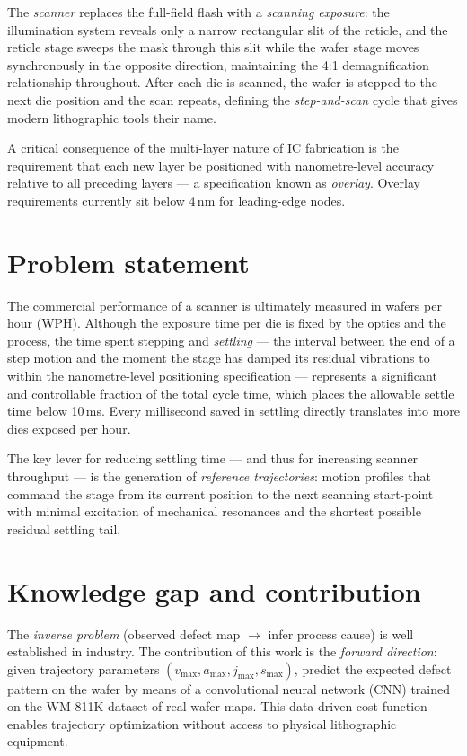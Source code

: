 \documentclass[11pt,letterpaper]{article}
\begin{document}
The \textit{scanner} replaces the full-field flash with a \textit{scanning exposure}: the illumination system reveals only a narrow rectangular slit of the reticle, and the reticle stage sweeps the mask through this slit while the wafer stage moves synchronously in the opposite direction, maintaining the 4:1 demagnification relationship throughout. After each die is scanned, the wafer is stepped to the next die position and the scan repeats, defining the \textit{step-and-scan} cycle that gives modern lithographic tools their name.

A critical consequence of the multi-layer nature of IC fabrication is the requirement that each new layer be positioned with nanometre-level accuracy relative to all preceding layers --- a specification known as \textit{overlay}. Overlay requirements currently sit below 4\,nm for leading-edge nodes.

\section*{Problem statement}

The commercial performance of a scanner is ultimately measured in wafers per hour (WPH). Although the exposure time per die is fixed by the optics and the process, the time spent stepping and \textit{settling} --- the interval between the end of a step motion and the moment the stage has damped its residual vibrations to within the nanometre-level positioning specification --- represents a significant and controllable fraction of the total cycle time, which places the allowable settle time below 10\,ms. Every millisecond saved in settling directly translates into more dies exposed per hour.

The key lever for reducing settling time --- and thus for increasing scanner throughput --- is the generation of \textit{reference trajectories}: motion profiles that command the stage from its current position to the next scanning start-point with minimal excitation of mechanical resonances and the shortest possible residual settling tail.

\section*{Knowledge gap and contribution}

The \textit{inverse problem} (observed defect map $\to$ infer process cause) is well established in industry. The contribution of this work is the \textit{forward direction}: given trajectory parameters $(v_{\max}, a_{\max}, j_{\max}, s_{\max})$, predict the expected defect pattern on the wafer by means of a convolutional neural network (CNN) trained on the WM-811K dataset of real wafer maps. This data-driven cost function enables trajectory optimization without access to physical lithographic equipment.
\end{document}
